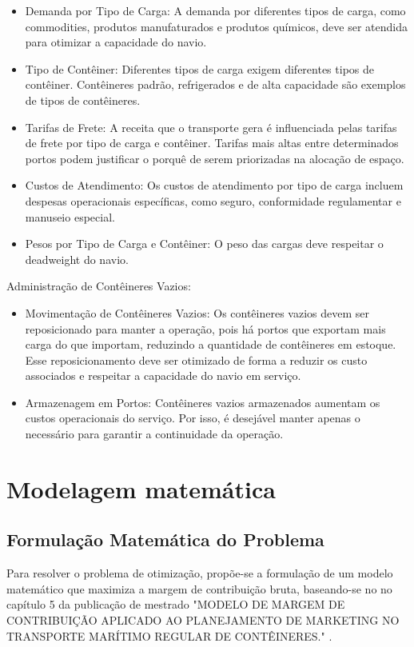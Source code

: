 \documentclass[preprint,10pt,5p]{elsarticle}
\begin{document}
\begin{itemize}

    \item Demanda por Tipo de Carga: A demanda por diferentes tipos de carga, como commodities, produtos manufaturados e produtos químicos, deve ser atendida para otimizar a capacidade do navio.
    \item Tipo de Contêiner: Diferentes tipos de carga exigem diferentes tipos de contêiner. Contêineres padrão, refrigerados e de alta capacidade são exemplos de tipos de contêineres.
    \item Tarifas de Frete: A receita que o transporte gera é influenciada pelas tarifas de frete por tipo de carga e contêiner. Tarifas mais altas entre determinados portos podem justificar o porquê de serem priorizadas na alocação de espaço.
    \item Custos de Atendimento: Os custos de atendimento por tipo de carga incluem despesas operacionais específicas, como seguro, conformidade regulamentar e manuseio especial.
    \item Pesos por Tipo de Carga e Contêiner: O peso das cargas deve respeitar o deadweight do navio.
\end{itemize}


Administração de Contêineres Vazios:

\begin{itemize}

    \item Movimentação de Contêineres Vazios: Os contêineres vazios devem ser reposicionado para manter a operação, pois há portos que exportam mais carga do que importam, reduzindo a quantidade de contêineres em estoque. Esse reposicionamento deve ser otimizado de forma a reduzir os custo associados e respeitar a capacidade do navio em serviço.

    \item Armazenagem em Portos: Contêineres vazios armazenados aumentam os custos operacionais do serviço. Por isso, é desejável manter apenas o necessário para garantir a continuidade da operação.

\end{itemize}

\section{Modelagem matemática}


\subsection{Formulação Matemática do Problema}
Para resolver o problema de otimização, propõe-se a formulação de um modelo matemático que maximiza a margem de contribuição bruta, baseando-se no no capítulo 5 da publicação de mestrado "MODELO DE MARGEM DE CONTRIBUIÇÃO APLICADO AO PLANEJAMENTO DE MARKETING NO 
TRANSPORTE MARÍTIMO REGULAR DE CONTÊINERES." \cite{costa2006modelo}. 
\end{document}
